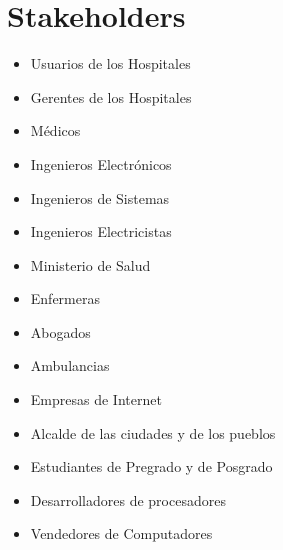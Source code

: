\documentclass[10pt,graphicx,caption,rotating]{article}
\begin{document}
\section{Stakeholders}
\begin{itemize}
 \item Usuarios de los Hospitales
 \item Gerentes de los Hospitales
 \item Médicos
 \item Ingenieros Electrónicos
 \item Ingenieros de Sistemas
 \item Ingenieros Electricistas
 \item Ministerio de Salud
 \item Enfermeras
 \item Abogados
 \item Ambulancias
 \item Empresas de Internet
 \item Alcalde de las ciudades y de los pueblos
 \item Estudiantes de Pregrado y de Posgrado
 \item Desarrolladores de procesadores
 \item Vendedores de Computadores
\end{itemize}
\end{document}
